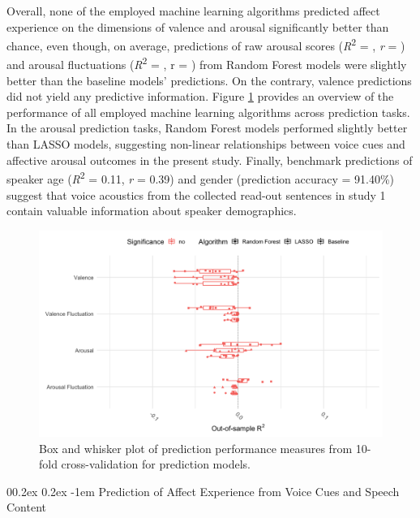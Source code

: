 \documentclass[
  man,floatsintext]{apa6}
\makeatletter
\let\oldparagraph\paragraph
\renewcommand{\paragraph}[1]{\oldparagraph{#1}\mbox{}}
\renewcommand{\paragraph}{\@startsection{paragraph}{4}{\parindent}%
  {0\baselineskip \@plus 0.2ex \@minus 0.2ex}%
  {-1em}%
  {\normalfont\normalsize\bfseries\itshape\typesectitle}}
\makeatother
\begin{document}
Overall, none of the employed machine learning algorithms predicted affect experience on the dimensions of valence and arousal significantly better than chance, even though, on average, predictions of raw arousal scores (\emph{R}\textsuperscript{2} = , \emph{r} = ) and arousal fluctuations (\emph{R}\textsuperscript{2} = , r = ) from Random Forest models were slightly better than the baseline models' predictions. On the contrary, valence predictions did not yield any predictive information. Figure \ref{fig:gerpredictionoverview} provides an overview of the performance of all employed machine learning algorithms across prediction tasks. In the arousal prediction tasks, Random Forest models performed slightly better than LASSO models, suggesting non-linear relationships between voice cues and affective arousal outcomes in the present study. Finally, benchmark predictions of speaker age (\emph{R}\textsuperscript{2} = 0.11, \emph{r} = 0.39) and gender (prediction accuracy = 91.40\%) suggest that voice acoustics from the collected read-out sentences in study 1 contain valuable information about speaker demographics.

\begin{figure}

{\centering \includegraphics[width=1\linewidth,height=0.45\textheight]{../figures/bmr_ger_egemaps_plot} 

}

\caption[Prediction performance Study 1]{Box and whisker plot of prediction performance measures from 10-fold cross-validation for prediction models.}\label{fig:gerpredictionoverview}
\end{figure}

\hypertarget{prediction-of-affect-experience-from-voice-cues-and-speech-content}{%
\paragraph{Prediction of Affect Experience from Voice Cues and Speech Content}\label{prediction-of-affect-experience-from-voice-cues-and-speech-content}}
\end{document}
